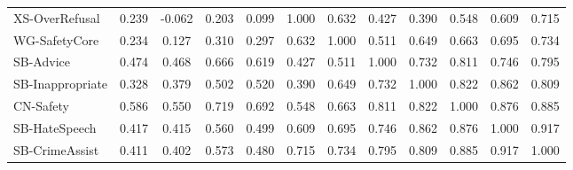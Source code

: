 \begin{tabular}{lccccccccccc}
\midrule
XS-OverRefusal & \cellcolor[HTML]{ffbab5}0.239 & \cellcolor[HTML]{ff7c73}-0.062 & \cellcolor[HTML]{ffb1ab}0.203 & \cellcolor[HTML]{ff958e}0.099 & \cellcolor[HTML]{57bb8a}1.000 & \cellcolor[HTML]{d2ede0}0.632 & \cellcolor[HTML]{ffebea}0.427 & \cellcolor[HTML]{ffe2e0}0.390 & \cellcolor[HTML]{eef8f3}0.548 & \cellcolor[HTML]{daf0e5}0.609 & \cellcolor[HTML]{b6e1cc}0.715 \\
WG-SafetyCore & \cellcolor[HTML]{ffb9b4}0.234 & \cellcolor[HTML]{ff9d96}0.127 & \cellcolor[HTML]{ffcdc9}0.310 & \cellcolor[HTML]{ffc9c6}0.297 & \cellcolor[HTML]{d2ede0}0.632 & \cellcolor[HTML]{57bb8a}1.000 & \cellcolor[HTML]{fbfdfc}0.511 & \cellcolor[HTML]{cceadc}0.649 & \cellcolor[HTML]{c8e8d8}0.663 & \cellcolor[HTML]{bde4d1}0.695 & \cellcolor[HTML]{b0dfc8}0.734 \\
SB-Advice & \cellcolor[HTML]{fff8f7}0.474 & \cellcolor[HTML]{fff6f6}0.468 & \cellcolor[HTML]{c7e8d8}0.666 & \cellcolor[HTML]{d7eee3}0.619 & \cellcolor[HTML]{ffebea}0.427 & \cellcolor[HTML]{fbfdfc}0.511 & \cellcolor[HTML]{57bb8a}1.000 & \cellcolor[HTML]{b1dfc8}0.732 & \cellcolor[HTML]{96d4b6}0.811 & \cellcolor[HTML]{acddc5}0.746 & \cellcolor[HTML]{9bd6b9}0.795 \\
SB-Inappropriate & \cellcolor[HTML]{ffd1ce}0.328 & \cellcolor[HTML]{ffdfdd}0.379 & \cellcolor[HTML]{fefefe}0.502 & \cellcolor[HTML]{f8fcfa}0.520 & \cellcolor[HTML]{ffe2e0}0.390 & \cellcolor[HTML]{cceadc}0.649 & \cellcolor[HTML]{b1dfc8}0.732 & \cellcolor[HTML]{57bb8a}1.000 & \cellcolor[HTML]{92d3b3}0.822 & \cellcolor[HTML]{85cdaa}0.862 & \cellcolor[HTML]{97d4b6}0.809 \\
CN-Safety & \cellcolor[HTML]{e2f3ea}0.586 & \cellcolor[HTML]{eef8f3}0.550 & \cellcolor[HTML]{b5e1cb}0.719 & \cellcolor[HTML]{bee4d2}0.692 & \cellcolor[HTML]{eef8f3}0.548 & \cellcolor[HTML]{c8e8d8}0.663 & \cellcolor[HTML]{96d4b6}0.811 & \cellcolor[HTML]{92d3b3}0.822 & \cellcolor[HTML]{57bb8a}1.000 & \cellcolor[HTML]{80cba7}0.876 & \cellcolor[HTML]{7dcaa4}0.885 \\
SB-HateSpeech & \cellcolor[HTML]{ffe9e7}0.417 & \cellcolor[HTML]{ffe8e7}0.415 & \cellcolor[HTML]{eaf6f0}0.560 & \cellcolor[HTML]{fffefe}0.499 & \cellcolor[HTML]{daf0e5}0.609 & \cellcolor[HTML]{bde4d1}0.695 & \cellcolor[HTML]{acddc5}0.746 & \cellcolor[HTML]{85cdaa}0.862 & \cellcolor[HTML]{80cba7}0.876 & \cellcolor[HTML]{57bb8a}1.000 & \cellcolor[HTML]{72c69d}0.917 \\
SB-CrimeAssist & \cellcolor[HTML]{ffe7e6}0.411 & \cellcolor[HTML]{ffe5e3}0.402 & \cellcolor[HTML]{e6f5ed}0.573 & \cellcolor[HTML]{fff9f9}0.480 & \cellcolor[HTML]{b6e1cc}0.715 & \cellcolor[HTML]{b0dfc8}0.734 & \cellcolor[HTML]{9bd6b9}0.795 & \cellcolor[HTML]{97d4b6}0.809 & \cellcolor[HTML]{7dcaa4}0.885 & \cellcolor[HTML]{72c69d}0.917 & \cellcolor[HTML]{57bb8a}1.000 \\
\bottomrule
\end{tabular}